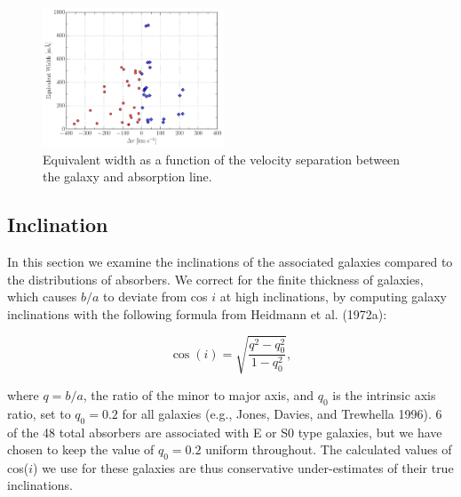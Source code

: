 \documentclass[iop]{emulateapj-rtx4}
\begin{document}
\begin{figure}[ht!]
        \centering
        \includegraphics[width=0.48\textwidth]{W(vel_diff).pdf}
        \caption{\small{Equivalent width as a function of the velocity separation between the galaxy and absorption line.}}
        \label{W_veldif}
        \vspace{5pt}
\end{figure} 


\subsection{Inclination}
In this section we examine the inclinations of the associated galaxies compared to the distributions of absorbers. We correct for the finite thickness of galaxies, which causes $b/a$ to deviate from cos $i$ at high inclinations, by computing galaxy inclinations with the following formula from Heidmann et al. (1972a):

\begin{equation}
	\cos(i) = \sqrt{\frac{q^2 - q_0^2}{1 - q_0^2}},
	\label{incEq}
\end{equation}

\noindent where $q = b/a$, the ratio of the minor to major axis, and $q_0$ is the intrinsic axis ratio, set to $q_0 = 0.2$ for all galaxies (e.g., Jones, Davies, and Trewhella 1996). 6 of the 48 total absorbers are associated with E or S0 type galaxies, but we have chosen to keep the value of $q_0 = 0.2$ uniform throughout. The calculated values of cos($i$) we use for these galaxies are thus conservative under-estimates of their true inclinations.

\end{document}
